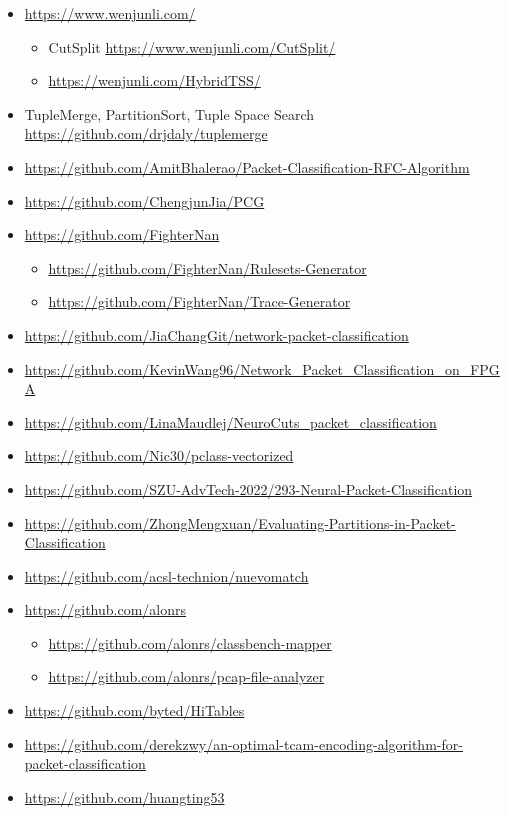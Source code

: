 \documentclass[acmsmall]{acmart}
\begin{document}
\begin{itemize}
\item \url{https://www.wenjunli.com/}
  \begin{itemize}
  \item CutSplit \url{https://www.wenjunli.com/CutSplit/}
  \item \url{https://wenjunli.com/HybridTSS/}
  \end{itemize}
\item TupleMerge, PartitionSort, Tuple Space Search
  \url{https://github.com/drjdaly/tuplemerge}
\item \url{https://github.com/AmitBhalerao/Packet-Classification-RFC-Algorithm}
\item \url{https://github.com/ChengjunJia/PCG}
\item \url{https://github.com/FighterNan}
  \begin{itemize}
  \item \url{https://github.com/FighterNan/Rulesets-Generator}
  \item \url{https://github.com/FighterNan/Trace-Generator}
  \end{itemize}
\item \url{https://github.com/JiaChangGit/network-packet-classification}
\item \url{https://github.com/KevinWang96/Network_Packet_Classification_on_FPGA}
\item \url{https://github.com/LinaMaudlej/NeuroCuts_packet_classification}
\item \url{https://github.com/Nic30/pclass-vectorized}
\item \url{https://github.com/SZU-AdvTech-2022/293-Neural-Packet-Classification}
\item \url{https://github.com/ZhongMengxuan/Evaluating-Partitions-in-Packet-Classification}
\item \url{https://github.com/acsl-technion/nuevomatch}
\item \url{https://github.com/alonrs}
  \begin{itemize}
  \item \url{https://github.com/alonrs/classbench-mapper}
  \item \url{https://github.com/alonrs/pcap-file-analyzer}
  \end{itemize}
\item \url{https://github.com/byted/HiTables}
\item \url{https://github.com/derekzwy/an-optimal-tcam-encoding-algorithm-for-packet-classification}
\item \url{https://github.com/huangting53}

\end{itemize}
\end{document}
